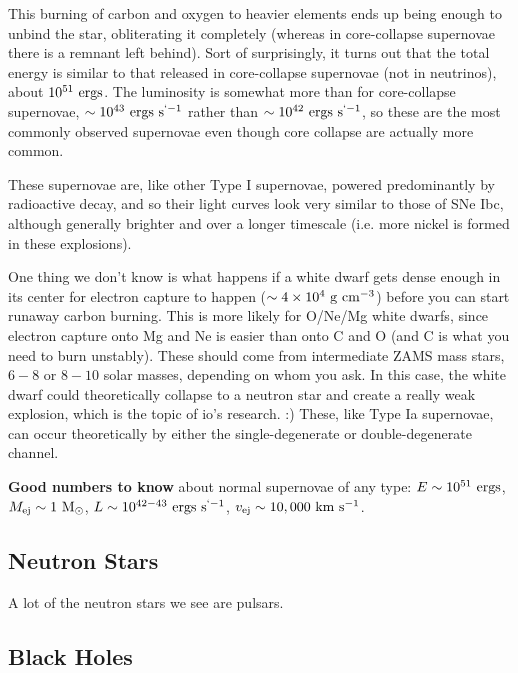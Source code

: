 This burning of carbon and oxygen to heavier elements ends up being enough to unbind the star, obliterating it completely (whereas in core-collapse supernovae there is a remnant left behind). Sort of surprisingly, it turns out that the total energy is similar to that released in core-collapse supernovae (not in neutrinos), about $10^{51}~{\rm ergs}$. The luminosity is somewhat more than for core-collapse supernovae, $\sim10^{43}~{\rm ergs}~{\rm s}^{`-1}$ rather than $\sim10^{42}~{\rm ergs}~{\rm s}^{`-1}$, so these are the most commonly observed supernovae even though core collapse are actually more common.

These supernovae are, like other Type I supernovae, powered predominantly by radioactive decay, and so their light curves look very similar to those of SNe Ibc, although generally brighter and over a longer timescale (i.e. more nickel is formed in these explosions).

One thing we don't know is what happens if a white dwarf gets dense enough in its center for electron capture to happen ($\sim 4\times 10^4~{\rm g}~{\rm cm}^{-3}$) before you can start runaway carbon burning. This is more likely for O/Ne/Mg white dwarfs, since electron capture onto Mg and Ne is easier than onto C and O (and C is what you need to burn unstably). These should come from intermediate ZAMS mass stars, $6-8$ or $8-10$ solar masses, depending on whom you ask. In this case, the white dwarf could theoretically collapse to a neutron star and create a really weak explosion, which is the topic of io's research. :) These, like Type Ia supernovae, can occur theoretically by either the single-degenerate or double-degenerate channel.

\textbf{Good numbers to know} about normal supernovae of any type: $E \sim 10^{51}~{\rm ergs}$, $M_{\rm ej} \sim 1~{\rm M}_\odot$, $L \sim 10^{42-43}~{\rm ergs}~{\rm s}^{`-1}$, $v_{\rm ej} \sim 10,000~{\rm km}~{\rm s}^{-1}$.

\subsection{Neutron Stars}

A lot of the neutron stars we see are pulsars.

\subsection{Black Holes}

